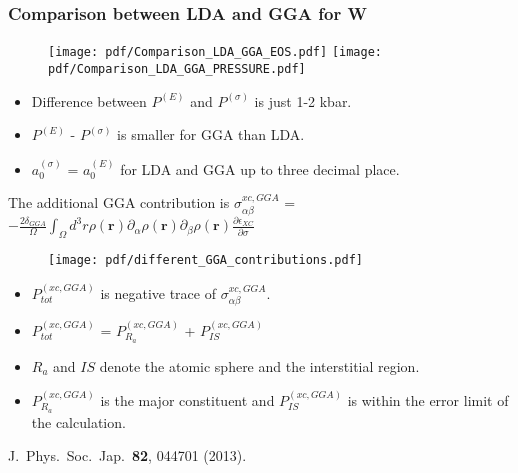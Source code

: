\documentclass[10pt, handout]{beamer}
\newcommand{\sig}{\sigma}
\newcommand{\nologo}{\setbeamertemplate{logo}{}}  %
\begin{document}
{\nologo		
\begin{frame}
	\frametitle{Comparison between LDA and GGA for W}
		\begin{minipage}{0.5\textwidth}
		\begin{figure}
			\texttt{[image: pdf/Comparison\_LDA\_GGA\_EOS.pdf]}
			\texttt{[image: pdf/Comparison\_LDA\_GGA\_PRESSURE.pdf]}	
		\end{figure}
	     \vspace{-0.4cm}
	    \begin{tiny}
	    	\begin{itemize}
	    		\item Difference between $P^{(E)}$ and $P^{(\sig)}$ is just 1-2 kbar.
	    		\item $P^{(E)}$ - $P^{(\sig)}$ is smaller for GGA than LDA.
	    		\item $a_0^{(\sig)}$ = $a_0^{(E)}$ for LDA and GGA up to three decimal place.
	    	\end{itemize}
	    \end{tiny}
		\end{minipage}%
    	\begin{minipage}{0.5\textwidth}
            The additional GGA contribution is \hspace{0.5cm}
    		{\tiny 
    			$\sigma_{\alpha\beta}^{xc, GGA}$ = $ - \frac{2\delta_{GGA}}{\Omega} \int_\Omega d^3r \rho(\textbf{r}) \partial_\alpha \rho(\textbf{r}) \partial_\beta \rho(\textbf{r}) \frac{\partial \epsilon_{XC}}{\partial \sigma} $
    		}
    		\begin{figure}
    			\texttt{[image: pdf/different\_GGA\_contributions.pdf]}		
    		\end{figure}
    	    \vspace{-0.5cm}
    	    \begin{small}
    	    	\begin{itemize}
    	    		\item $P_{tot}^{(xc,GGA)}$ is negative trace of $\sigma_{\alpha\beta}^{xc, GGA}$.
    	    		\item $P_{tot}^{(xc,GGA)}$ = $P_{R_a}^{(xc,GGA)}$ + $P_{IS}^{(xc,GGA)}$
    	    		\item $R_a$ and $IS$ denote the atomic sphere and the interstitial region.    	    		    	    		 		
    	    		\item $P_{R_a}^{(xc,GGA)}$ is the major constituent and $P_{IS}^{(xc,GGA)}$ is within the error limit of the calculation.
    	    	\end{itemize}
                \hspace{1cm}
        	    {\tiny J.\ Phys.\ Soc.\ Jap.\ \textbf{82}, 044701 (2013). }
    	    \end{small}
	   \end{minipage}
\end{frame}
}		
		
\end{document}
